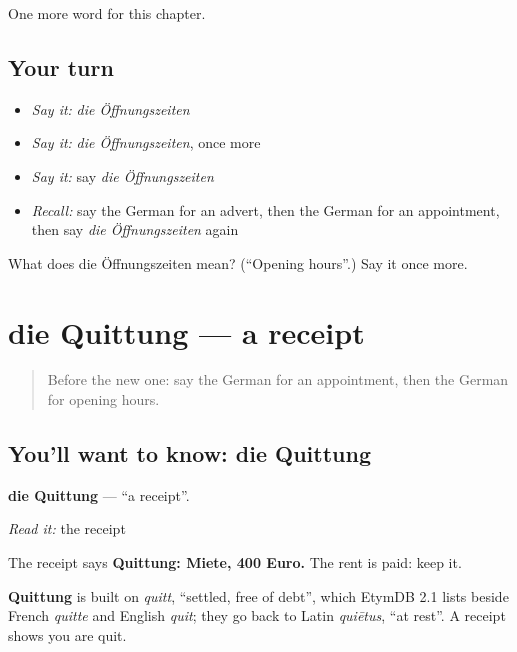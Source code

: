 \begin{grammarlens}[title={What you've built}]
One more word for this chapter.
\end{grammarlens}

\subsection*{Your turn}
\begin{itemize}
\raggedright
  \item \emph{Say it:} \emph{die Öffnungszeiten}
  \item \emph{Say it:} \emph{die Öffnungszeiten}, once more
  \item \emph{Say it:} say \emph{die Öffnungszeiten}
  \item \emph{Recall:} say the German for an advert, then the German for an appointment, then say \emph{die Öffnungszeiten} again
\end{itemize}

\begin{tcolorbox}[breakable,colback=teal!4,colframe=teal!35!black,title={Before you move on}]
What does die Öffnungszeiten mean? (\textquotedblleft{}Opening hours\textquotedblright{}.) Say it once more.
\end{tcolorbox}
\section[die Quittung]{die Quittung — a receipt}

\label{lesson:GE-C143-quittung}



\begin{quote}
Before the new one: say the German for an appointment, then the German for opening hours.
\end{quote}

\subsection*{You'll want to know: die Quittung}
\textbf{die Quittung} — \textquotedblleft{}a receipt\textquotedblright{}.

\emph{Read it:} the receipt

The receipt says \textbf{Quittung: Miete, 400 Euro.} The rent is paid: keep it.

\begin{cousinweb}
\textbf{Quittung} is built on \emph{quitt}, \textquotedblleft{}settled, free of debt\textquotedblright{}, which EtymDB 2.1 lists beside French \emph{quitte} and English \emph{quit}; they go back to Latin \emph{quiētus}, \textquotedblleft{}at rest\textquotedblright{}. A receipt shows you are quit.
\end{cousinweb}

